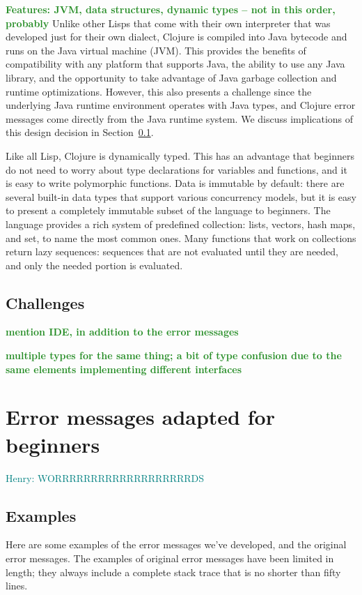 \documentclass[submission,copyright,creativecommons]{eptcs}
\newcommand{\allcomments}[1]{{#1}}
\newcommand{\emcomment}[1]{{\bf \textcolor{ForestGreen}{\allcomments{{#1}}}}}
\newcommand{\hfcomment}[1]{\textcolor{Teal}{\allcomments{Henry: {#1}}}}
\begin{document}
\emcomment{Features: JVM, data structures, dynamic types -- not in this order, probably}
Unlike other Lisps that come with their own interpreter that was developed just for their own dialect, Clojure is compiled 
into Java bytecode and runs on the Java virtual machine (JVM). This provides the benefits of compatibility with 
any platform that supports Java, the ability to use any Java library, and the opportunity to take advantage of Java 
garbage collection and runtime optimizations. However, this also presents a challenge since the underlying Java 
runtime environment operates with Java types, and Clojure error messages come directly from the Java runtime
system. We discuss implications of this design decision in Section~\ref{subsec:challenges}.

Like all Lisp, Clojure is dynamically typed. This has an advantage that beginners do not need to worry about type declarations
for variables and functions, and it is easy to write polymorphic functions. 
Data is immutable by default: there are several built-in data types that support various concurrency models, 
but it is easy to present a completely immutable subset of the language to beginners. 
The language provides a rich system of predefined collection: lists, vectors, hash maps, and set, to name the 
most common ones. Many functions that work on collections return lazy sequences: sequences that are not evaluated 
until they are needed, and only the needed portion is evaluated. 
 

\subsection{Challenges}\label{subsec:challenges}

\emcomment{mention IDE, in addition to the error messages}

\emcomment{multiple types for the same thing; a bit of type confusion due to the same elements implementing different interfaces}

\section{Error messages adapted for beginners}\label{sec:errors-work}
\hfcomment{WORRRRRRRRRRRRRRRRRRRDS}

\subsection{Examples}
Here are some examples of the error messages we've developed, and the original error messages. 
The examples of original error messages have been limited in length; they always include a complete stack trace that is no shorter than fifty lines.
\end{document}
